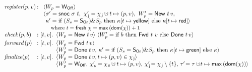
{
\begin{figure}[t]
%
\centering
\small
\[
\begin{array}{l@{\, :\ } l}
 \aux{register}(p,v) & 
  \begin{array}[t]{l}
   \langle \wpp = \wInit\rangle\\ 
   \langle\ordlistP = \mathsf{snoc}\ {\ordlist}\ t,\
     \histJP = \histJ \hunion t \hpts (p,v),\ \wppP = \wWrite\ t\, v,\\
   \phantom{\langle} \C' = \textrm{if}\ (\sss = \sOn) \& \spp\
                    \textrm{then}\ \C[t \mapsto \mathsf{yellow}]\
                    \textrm{else}\ \C[t \mapsto \mathsf{red}]\rangle \\
   \ \mbox{\small{where $t = \mathsf{fresh}\ \hist = \mathsf{max}\, (\dom{\hist})+1$}}
  \end{array} \\[2.5pt]
  \aux{check}\,(p,b) & [t, v]\ldot
  \!\begin{array}[t]{l}
  \langle\wpp = \wWrite\ t\, v\rangle\ 
  \langle\wppP = \textrm{if}\ b\
  \textrm{then}\ \wDirty\ t\, \,v\ \textrm{else}\ \wClean\ t\, v\rangle
 \end{array}\\[2.5pt]
  \aux{forward}\,(p) & [t, v]\ldot
  \!\begin{array}[t]{l}
   \langle\wpp = \wDirty\ t\,v \rangle\\ 
   \langle\wppP = \wClean\ t\,v,\, %
   \C' = \textrm{if}\ (\sss=\sOn) \& \spp\ \textrm{then}\ \C[t \mapsto \mathsf{green}]\ \textrm{else}\ \C\rangle
  \end{array}\\[2.5 pt]
  \aux{finalize}(p) & [t, v]\ldot
  \!\begin{array}[t]{l}
  \langle\wpp = \wClean\ t\, v, %
  t \hpts (p, v) \in \histJ \rangle\\
  \langle\wppP = \wInit,\, \histSP = \histS \hunion t \hpts (p,v),\, %
  \histJP\! = \histJ\setminus\{t\},\,
  \E'\! = \E \hunion\! t \hpts \mathsf{max}\, (\dom{\hist}) \rangle
 \end{array}
\end{array}
\]

\end{figure}}
